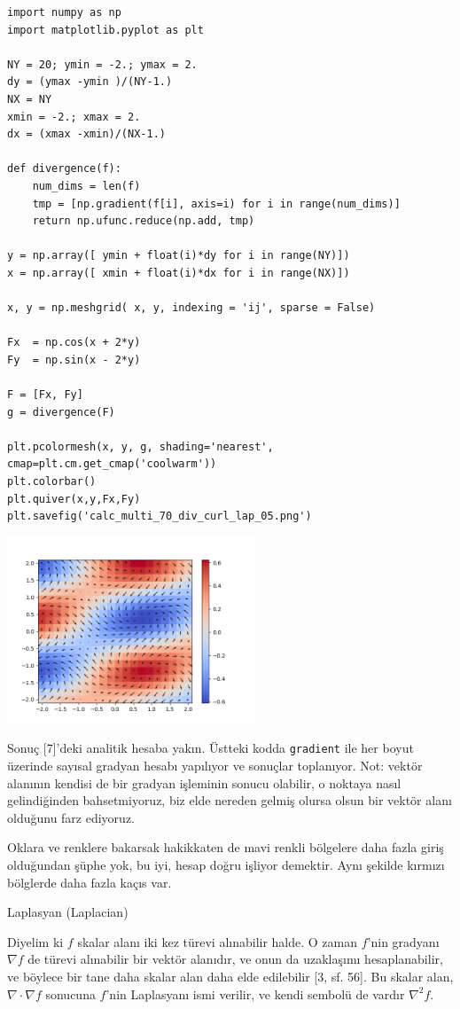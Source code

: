 \documentclass[12pt,fleqn]{article}\usepackage{../../common}
\begin{document}
\begin{verbatim}
import numpy as np
import matplotlib.pyplot as plt

NY = 20; ymin = -2.; ymax = 2.
dy = (ymax -ymin )/(NY-1.)
NX = NY
xmin = -2.; xmax = 2.
dx = (xmax -xmin)/(NX-1.)

def divergence(f):
    num_dims = len(f)
    tmp = [np.gradient(f[i], axis=i) for i in range(num_dims)]
    return np.ufunc.reduce(np.add, tmp)

y = np.array([ ymin + float(i)*dy for i in range(NY)])
x = np.array([ xmin + float(i)*dx for i in range(NX)])

x, y = np.meshgrid( x, y, indexing = 'ij', sparse = False)

Fx  = np.cos(x + 2*y)
Fy  = np.sin(x - 2*y)

F = [Fx, Fy]
g = divergence(F)

plt.pcolormesh(x, y, g, shading='nearest', cmap=plt.cm.get_cmap('coolwarm'))
plt.colorbar()
plt.quiver(x,y,Fx,Fy)
plt.savefig('calc_multi_70_div_curl_lap_05.png')
\end{verbatim}

\includegraphics[width=20em]{calc_multi_70_div_curl_lap_05.png}

Sonuç [7]'deki analitik hesaba yakın. Üstteki kodda \verb!gradient! ile her
boyut üzerinde sayısal gradyan hesabı yapılıyor ve sonuçlar toplanıyor. Not:
vektör alanının kendisi de bir gradyan işleminin sonucu olabilir, o noktaya
nasıl gelindiğinden bahsetmiyoruz, biz elde nereden gelmiş olursa olsun bir
vektör alanı olduğunu farz ediyoruz.

Oklara ve renklere bakarsak hakikkaten de mavi renkli bölgelere daha fazla giriş
olduğundan şüphe yok, bu iyi, hesap doğru işliyor demektir. Aynı şekilde kırmızı
bölglerde daha fazla kaçıs var.

Laplasyan (Laplacian)

Diyelim ki $f$ skalar alanı iki kez türevi alınabilir halde. O zaman $f$'nin
gradyanı $\nabla f$ de türevi alınabilir bir vektör alanıdır, ve onun da
uzaklaşımı hesaplanabilir, ve böylece bir tane daha skalar alan daha elde
edilebilir [3, sf. 56]. Bu skalar alan, $\nabla \cdot \nabla f$ sonucuna $f$'nin
Laplasyanı ismi verilir, ve kendi sembolü de vardır $\nabla^2 f$.
\end{document}
